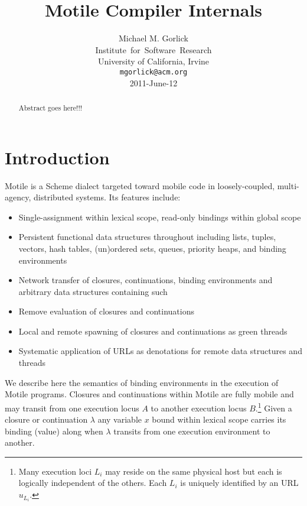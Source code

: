 \documentclass[11pt,peerreview]{IEEEtran}
\begin{document}
\title{Motile Compiler Internals}
\author{
Michael M. Gorlick \\
Institute~for~Software~Research \\
University of California, Irvine \\
{\tt mgorlick@acm.org} \\
2011-June-12
}


\maketitle
\begin{abstract}
Abstract goes here!!!
\end{abstract}
 
\section{Introduction}
Motile is a Scheme dialect targeted toward mobile code in loosely-coupled, multi-agency, distributed systems.
Its features include:
\begin{itemize}
\item Single-assignment within lexical scope, read-only bindings within global scope
\item Persistent functional data structures throughout including lists, tuples, vectors, hash tables, (un)ordered sets,
queues, priority heaps, and binding environments
\item Network transfer of closures, continuations, binding environments and arbitrary data structures containing such
\item Remove evaluation of closures and continuations
\item Local and remote spawning of closures and continuations as green threads
\item Systematic application of URLs as denotations for remote data structures and threads
\end{itemize}
We describe here the semantics of binding environments in the execution of Motile programs.
Closures and continuations within Motile are fully mobile and may transit from one
execution locus $A$ to another execution locus $B$.\footnote{
Many execution loci $L_i$ may reside on the same physical host but each is logically independent of the others.
Each $L_i$ is uniquely identified by an URL $u_{L_i}$.
}
Given a closure or continuation $\lambda$ any variable $x$ bound within lexical scope carries its binding (value)
along when $\lambda$ transits from one execution environment to another.
\end{document}
